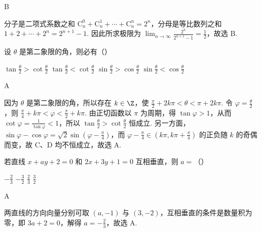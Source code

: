 \documentclass[UTF8,a4paper,oneside,11pt]{ctexbook}
\begin{document}
\begin{answer}
B
\end{answer}

\begin{solution}
分子是二项式系数之和 \(\mathrm C_n^0 + \mathrm C_n^1 + \cdots + \mathrm C_n^n = 2^n\)，分母是等比数列之和 \(1 + 2 + \cdots + 2^n = 2^{n+1} - 1\). 因此所求极限为 \(\displaystyle\lim_{n \to \infty} \frac{2^n}{2^{n+1} - 1} = \frac{1}{2}\)，故选 B.
\end{solution}

\begin{problem}
设 \(\theta\) 是第二象限的角，则必有（\quad）

\choices
    {\(\tan \frac{\theta}{2} > \cot \frac{\theta}{2}\)}
    {\(\tan \frac{\theta}{2} < \cot \frac{\theta}{2}\)}
    {\(\sin \frac{\theta}{2} > \cos \frac{\theta}{2}\)}
    {\(\sin \frac{\theta}{2} < \cos \frac{\theta}{2}\)}
\end{problem}

\begin{answer}
A
\end{answer}

\begin{solution}
因为 \(\theta\) 是第二象限的角，所以存在 \(k \in \Z\)，使 \(\frac{\pi}{2} + 2k\pi < \theta < \pi + 2k\pi\). 令 \(\varphi = \frac{\theta}{2}\)，则 \(\frac{\pi}{4} + k\pi < \varphi < \frac{\pi}{2} + k\pi\). 由正切函数以 \(\pi\) 为周期，得 \(\tan \varphi > 1\)，从而 \(\cot \varphi = \frac{1}{\tan \varphi} < 1\)，所以 \(\tan \frac{\theta}{2} > \cot \frac{\theta}{2}\) 恒成立.
另一方面，\(\sin \varphi - \cos \varphi = \sqrt{2}\sin \left(\varphi - \frac{\pi}{4}\right)\)，而 \(\varphi - \frac{\pi}{4} \in \left(k\pi, k\pi + \frac{\pi}{4}\right)\) 的正负随 \(k\) 的奇偶而变，故 C、D 均不恒成立，故选 A.
\end{solution}

\begin{problem}
若直线 \(x + ay + 2 = 0\) 和 \(2x + 3y + 1 = 0\) 互相垂直，则 \(a =\)（\quad）

\choices
    {\(-\frac{2}{3}\)}
    {\(-\frac{3}{2}\)}
    {\(\frac{2}{3}\)}
    {\(\frac{3}{2}\)}
\end{problem}

\begin{answer}
A
\end{answer}

\begin{solution}
两直线的方向向量分别可取 \((a, -1)\) 与 \((3, -2)\)，互相垂直的条件是数量积为零，即 \(3a + 2 = 0\)，解得 \(a = -\frac{2}{3}\)，故选 A.
\end{solution}
\end{document}
